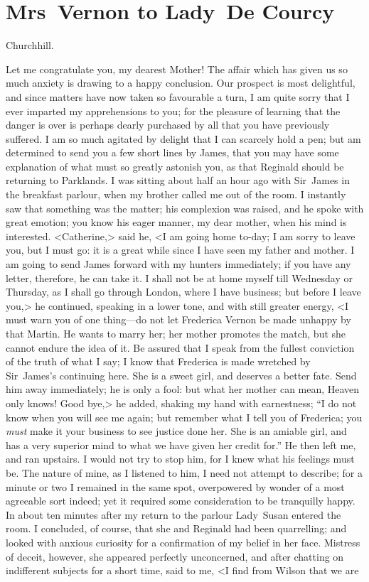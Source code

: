 \chapter{Mrs~Vernon to Lady~De Courcy}
  
  \begin{mail}{Churchhill.}{}

Let me congratulate you, my dearest Mother! The affair which has given us so much anxiety is drawing to a happy conclusion. Our prospect is most delightful, and since matters have now taken so favourable a turn, I am quite sorry that I ever imparted my apprehensions to you; for the pleasure of learning that the danger is over is perhaps dearly purchased by all that you have previously suffered. I am so much agitated by delight that I can scarcely hold a pen; but am determined to send you a few short lines by James, that you may have some explanation of what must so greatly astonish you, as that Reginald should be returning to Parklands. I was sitting about half an hour ago with Sir~James in the breakfast parlour, when my brother called me out of the room. I instantly saw that something was the matter; his complexion was raised, and he spoke with great emotion; you know his eager manner, my dear mother, when his mind is interested. <Catherine,> said he, <I am going home to-day; I am sorry to leave you, but I must go: it is a great while since I have seen my father and mother. I am going to send James forward with my hunters immediately; if you have any letter, therefore, he can take it. I shall not be at home myself till Wednesday or Thursday, as I shall go through London, where I have business; but before I leave you,> he continued, speaking in a lower tone, and with still greater energy, <I must warn you of one thing—do not let Frederica Vernon be made unhappy by that Martin. He wants to marry her; her mother promotes the match, but she cannot endure the idea of it. Be assured that I speak from the fullest conviction of the truth of what I say; I know that Frederica is made wretched by Sir~James's continuing here. She is a sweet girl, and deserves a better fate. Send him away immediately; he is only a fool: but what her mother can mean, Heaven only knows! Good bye,> he added, shaking my hand with earnestness; “I do not know when you will see me again; but remember what I tell you of Frederica; you \textit{must} make it your business to see justice done her. She is an amiable girl, and has a very superior mind to what we have given her credit for.” He then left me, and ran upstairs. I would not try to stop him, for I knew what his feelings must be. The nature of mine, as I listened to him, I need not attempt to describe; for a minute or two I remained in the same spot, overpowered by wonder of a most agreeable sort indeed; yet it required some consideration to be tranquilly happy. In about ten minutes after my return to the parlour Lady~Susan entered the room. I concluded, of course, that she and Reginald had been quarrelling; and looked with anxious curiosity for a confirmation of my belief in her face. Mistress of deceit, however, she appeared perfectly unconcerned, and after chatting on indifferent subjects for a short time, said to me, <I find from Wilson that we are 
\end{mail}
